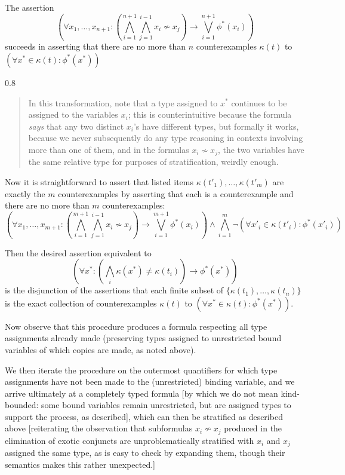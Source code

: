 \documentclass[12pt]{article}
\renewcommand{\smallpara}[1]{\begin{footnotesize}\begin{spacing}{0.8}\begin{quote} #1  \end{quote}\end{spacing}\end{footnotesize}}
\begin{document}
The assertion
$$(\forall x_1,\ldots,x_{n+1}: (\bigwedge_{i=1}^{n+1} \bigwedge_{j=1}^{i-1} x_i \not\sim x_j) \rightarrow \bigvee_{i=1}^{n+1}\phi^*(x_i))$$   succeeds in asserting that there are no more than $n$ counterexamples $\kappa(t)$ to $(\forall x^* \in \kappa(t):\phi^*(x^*))$ \smallpara{In this transformation, note that a type assigned to $x^*$ continues to be assigned to the variables $x_i$; this is counterintuitive because the formula {\em says\/} that any  two distinct $x_i$'s have different types, but formally it works, because we never subsequently do any type reasoning in contexts involving more than one of them, and in the formulas $x_i \not\sim x_j$, the two variables have the same relative type for purposes of stratification, weirdly enough.}
Now it is straightforward to assert that listed items $\kappa(t'_1),\ldots,\kappa(t'_m)$ are exactly the $m$ counterexamples by asserting that each is a counterexample and there are no more than $m$ counterexamples:   $$(\forall x_1,\ldots,x_{m+1}: (\bigwedge_{i=1}^{m+1} \bigwedge_{j=1}^{i-1} x_i \not\sim x_j) \rightarrow \bigvee_{i=1}^{m+1}\phi^*(x_i))\wedge \bigwedge_{i=1}^m \neg(\forall x'_i \in \kappa(t'_i):\phi^*(x'_i))$$

Then the desired assertion equivalent to $$(\forall x^*:(\bigwedge_i \kappa(x^*) \neq \kappa(t_i))\rightarrow \phi^*(x^*))$$  is the disjunction of the assertions that each finite subset of $\{\kappa(t_1),\ldots,\kappa(t_n)\}$ is the exact collection of counterexamples $\kappa(t)$  to $(\forall x^* \in \kappa(t):\phi^*(x^*))$.

Now observe that this procedure produces a formula respecting all type assignments already made (preserving types assigned to unrestricted bound variables of which copies are made, as noted above).

We then iterate the procedure on the outermost quantifiers for which type assignments have not been made to the (unrestricted) binding variable, and we arrive ultimately at a completely typed formula [by which we do not mean kind-bounded:  some bound variables remain unrestricted, but are assigned types to support the process, as described], which can then be stratified as described above [reiterating  the observation 
that subformulas $x_i \not\sim x_j$ produced in the elimination of exotic conjuncts are unproblematically stratified with $x_i$ and $x_j$ assigned the same type, as is easy to check by expanding them, though their semantics makes this rather unexpected.]

\endproof
\end{document}

